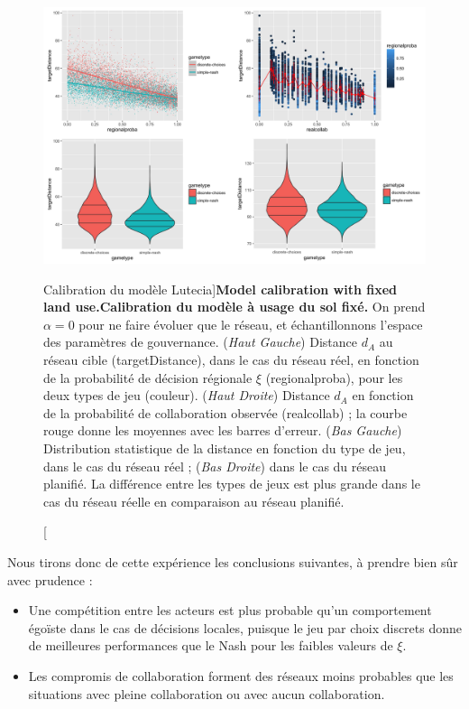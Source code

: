 \begin{figure}
	\includegraphics[width=\linewidth]{Figures/Final/7-3-3-fig-lutecia-calib.jpg}
	\caption[Calibration of the Lutecia model][Calibration du modèle Lutecia]{\textbf{Model calibration with fixed land use.}\label{fig:lutecia:calib}}{\textbf{Calibration du modèle à usage du sol fixé.} On prend $\alpha = 0$ pour ne faire évoluer que le réseau, et échantillonnons l'espace des paramètres de gouvernance. (\textit{Haut Gauche}) Distance $d_A$ au réseau cible (targetDistance), dans le cas du réseau réel, en fonction de la probabilité de décision régionale $\xi$ (regionalproba), pour les deux types de jeu (couleur). (\textit{Haut Droite}) Distance $d_A$ en fonction de la probabilité de collaboration observée (realcollab) ; la courbe rouge donne les moyennes avec les barres d'erreur. (\textit{Bas Gauche}) Distribution statistique de la distance en fonction du type de jeu, dans le cas du réseau réel ; (\textit{Bas Droite}) dans le cas du réseau planifié. La différence entre les types de jeux est plus grande dans le cas du réseau réelle en comparaison au réseau planifié.\label{fig:lutecia:calib}}
\end{figure}



Nous tirons donc de cette expérience les conclusions suivantes, à prendre bien sûr avec prudence :
\begin{itemize}
	\item Une compétition entre les acteurs est plus probable qu'un comportement égoïste dans le cas de décisions locales, puisque le jeu par choix discrets donne de meilleures performances que le Nash pour les faibles valeurs de $\xi$.
	\item Les compromis de collaboration forment des réseaux moins probables que les situations avec pleine collaboration ou avec aucun collaboration.
\end{itemize}


